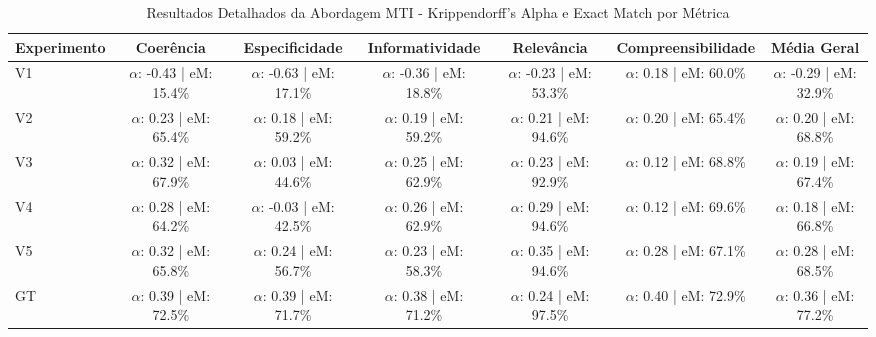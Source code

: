 \begin{table}[htbp]
\caption{Resultados Detalhados da Abordagem MTI - Krippendorff's Alpha e Exact Match por Métrica}
\label{tab:mti_krippendorff}
\centering

\begin{adjustbox}{max width=\textwidth}
\begin{tabular}{lcccccc}
\toprule
Experimento & Coerência & Especificidade & Informatividade & Relevância & Compreensibilidade & Média Geral \\
\midrule
V1 & $\alpha$: -0.43 | eM: 15.4\% & $\alpha$: -0.63 | eM: 17.1\% & $\alpha$: -0.36 | eM: 18.8\% & $\alpha$: -0.23 | eM: 53.3\% & $\alpha$: 0.18 | eM: 60.0\% & $\alpha$: -0.29 | eM: 32.9\% \\
V2 & $\alpha$: 0.23 | eM: 65.4\% & $\alpha$: 0.18 | eM: 59.2\% & $\alpha$: 0.19 | eM: 59.2\% & $\alpha$: 0.21 | eM: 94.6\% & $\alpha$: 0.20 | eM: 65.4\% & $\alpha$: 0.20 | eM: 68.8\% \\
V3 & $\alpha$: 0.32 | eM: 67.9\% & $\alpha$: 0.03 | eM: 44.6\% & $\alpha$: 0.25 | eM: 62.9\% & $\alpha$: 0.23 | eM: 92.9\% & $\alpha$: 0.12 | eM: 68.8\% & $\alpha$: 0.19 | eM: 67.4\% \\
V4 & $\alpha$: 0.28 | eM: 64.2\% & $\alpha$: -0.03 | eM: 42.5\% & $\alpha$: 0.26 | eM: 62.9\% & $\alpha$: 0.29 | eM: 94.6\% & $\alpha$: 0.12 | eM: 69.6\% & $\alpha$: 0.18 | eM: 66.8\% \\
V5 & $\alpha$: 0.32 | eM: 65.8\% & $\alpha$: 0.24 | eM: 56.7\% & $\alpha$: 0.23 | eM: 58.3\% & $\alpha$: 0.35 | eM: 94.6\% & $\alpha$: 0.28 | eM: 67.1\% & $\alpha$: 0.28 | eM: 68.5\% \\
GT & $\alpha$: 0.39 | eM: 72.5\% & $\alpha$: 0.39 | eM: 71.7\% & $\alpha$: 0.38 | eM: 71.2\% & $\alpha$: 0.24 | eM: 97.5\% & $\alpha$: 0.40 | eM: 72.9\% & $\alpha$: 0.36 | eM: 77.2\% \\
\bottomrule
\end{tabular}
\end{adjustbox}

\end{table}